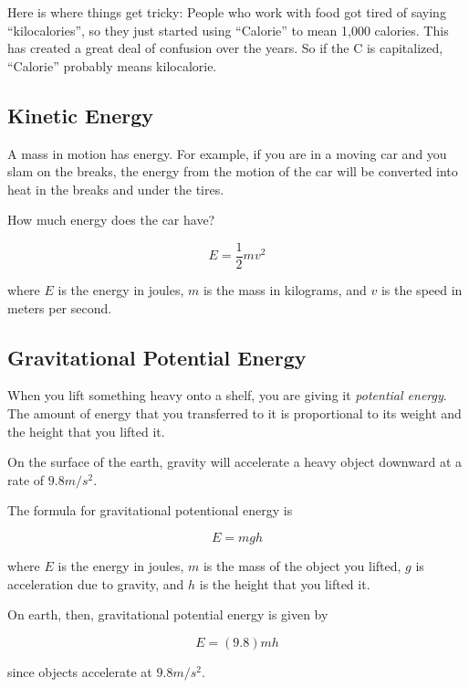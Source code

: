 Here is where things get tricky: People who work with food got tired of
saying ``kilocalories'', so they just started using ``Calorie'' to
mean 1,000 calories. This has created a great deal of confusion over the
years. So if the C is capitalized, ``Calorie'' probably means kilocalorie.

\subsection{Kinetic Energy}

A mass in motion has energy. For example, if you are in a moving car
and you slam on the breaks, the energy from the motion of the
car will be converted into heat in the breaks and under the tires.

How much energy does the car have?

\begin{mdframed}[style=important, frametitle={Formula for Kinetic Energy}]

$$E = \frac{1}{2} m v^2$$

where $E$ is the energy in joules, $m$ is the mass in kilograms, and
$v$ is the speed in meters per second.

\end{mdframed}

\subsection{Gravitational Potential Energy}


When you lift something heavy onto a shelf, you are giving it
\textit{potential energy}. The amount of energy that you transferred
to it is proportional to its weight and the height that you lifted it.

On the surface of the earth, gravity will accelerate a heavy object downward at
a rate of $9.8 m/s^2$.

\begin{mdframed}[style=important, frametitle={Formula for Gravitational Potential Energy}]
The formula for gravitational potentional energy is

$$E = mgh$$

where $E$ is the energy in joules, $m$ is the mass of the object you
lifted, $g$ is acceleration due to gravity, and $h$ is the height that you lifted it.

On earth, then, gravitational potential energy is given by

$$E = (9.8)mh$$

since objects accelerate at $9.8 m/s^2$.

\end{mdframed}


